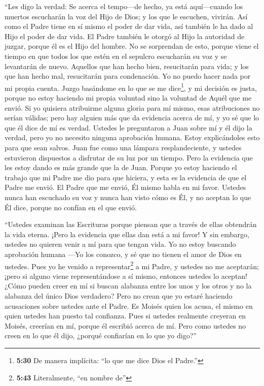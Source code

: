  ``Les digo la verdad: Se acerca el tempo---de hecho, ya
está aquí---cuando los muertos escucharán la voz del Hijo de Dios; y los
que le escuchen, vivirán.  Así como el Padre tiene en sí
mismo el poder de dar vida, así también le ha dado al Hijo el poder de
dar vida.  El Padre también le otorgó al Hijo la autoridad
de juzgar, porque él es el Hijo del hombre.  No se
sorprendan de esto, porque viene el tiempo en que todos los que estén en
el sepulcro escucharán su voz  y se levantarán de nuevo.
Aquellos que han hecho bien, resucitarán para vida; y los que han hecho
mal, resucitarán para condenación.  Yo no puedo hacer nada
por mi propia cuenta. Juzgo basándome en lo que se me dice\footnote{\textbf{5:30}
  De manera implícita: ``lo que me dice Dios el Padre.''}, y mi decisión
es justa, porque no estoy haciendo mi propia voluntad sino la voluntad
de Aquél que me envió.  Si yo quisiera atribuirme alguna
gloria para mí mismo, esas atribuciones no serían válidas; 
pero hay alguien más que da evidencia acerca de mí, y yo sé que lo que
él dice de mí es verdad.  Ustedes le preguntaron a Juan
sobre mí y él dijo la verdad,  pero yo no necesito ninguna
aprobación humana. Estoy explicándoles esto para que sean salvos.
 Juan fue como una lámpara resplandeciente, y ustedes
estuvieron dispuestos a disfrutar de su luz por un tiempo. 
Pero la evidencia que les estoy dando es más grande que la de Juan.
Porque yo estoy haciendo el trabajo que mi Padre me dio para que
hiciera,  y esta es la evidencia de que el Padre me envió.
El Padre que me envió, Él mismo habla en mi favor. Ustedes nunca han
escuchado su voz y nunca han visto cómo es Él,  y no
aceptan lo que Él dice, porque no confían en el que envió.

 ``Ustedes examinan las Escrituras porque piensan que a
través de ellas obtendrán la vida eterna. ¡Pero la evidencia que ellas
dan está a mi favor!  Y sin embargo, ustedes no quieren
venir a mí para que tengan vida.  Yo no estoy buscando
aprobación humana  ---Yo los conozco, y sé que no tienen el
amor de Dios en ustedes.  Pues yo he venido a
representar\footnote{\textbf{5:43} Literalmente, ``en nombre de''} a mi
Padre, y ustedes no me aceptarán; ¡pero si alguno viene representándose
a sí mismo, entonces ustedes lo aceptan!  ¿Cómo pueden
creer en mí si buscan alabanza entre los unos y los otros y no la
alabanza del único Dios verdadero?  Pero no crean que yo
estaré haciendo acusaciones sobre ustedes ante el Padre. Es Moisés quien
los acusa, el mismo en quien ustedes han puesto tal confianza.
 Pues si ustedes realmente creyeran en Moisés, creerían en
mí, porque él escribió acerca de mí.  Pero como ustedes no
creen en lo que él dijo, ¿porqué confiarían en lo que yo digo?''

